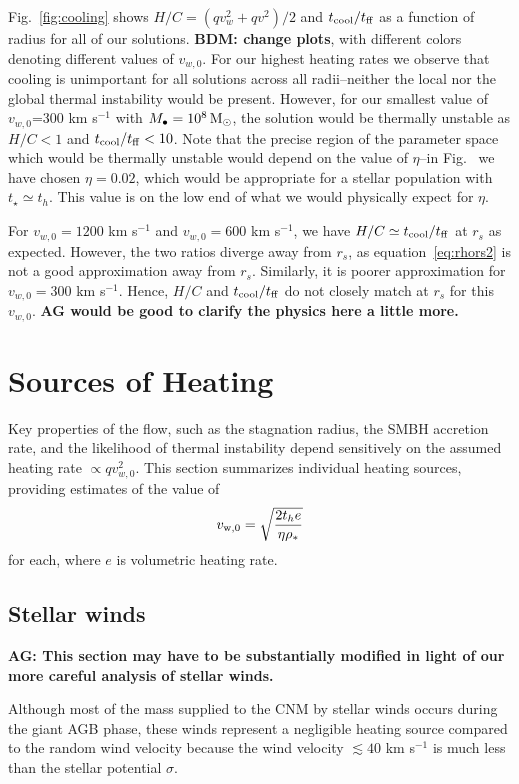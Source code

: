 \documentclass[usenatbib,fleqn]{mn2e}
\newcommand{\rs}{r_s}
\newcommand{\vw}{v_w}
\newcommand{\rhostar}{\rho_*}
\newcommand{\Mbh}[1][]{M_{\bullet#1}}
\newcommand{\vwO}{v_{w,0}}
\newcommand{\tage}{t_{\star}}
\renewcommand{\th}{t_h}
\newcommand{\tcool}{t_{\rm cool}}
\newcommand{\tff}{t_{\rm ff}}
\begin{document}
Fig.~\ref{fig:cooling} shows $H/C=(q \vw^2+q v^2)/2$ and $\tcool/\tff$
as a function of radius for all of our solutions. {\bf BDM: change
  plots}, with different colors denoting different values of $\vwO$.
For our highest heating rates we observe that cooling is unimportant
for all solutions across all radii--neither the local nor the global
thermal instability would be present. However,  for our smallest value
of $\vwO$=300 km s$^{-1}$ with $\Mbh=10^8 \Msun$, the solution would be
thermally unstable as $H/C<1$ and $\tcool/\tff<10$. Note that the
precise region of the parameter space which would be thermally
unstable would depend on the value of $\eta$--in
Fig.~\pageref{fig:cooling} we have chosen $\eta=0.02$, which would be
appropriate for a stellar population with $\tage\simeq \th$. This
value is on the low end of what we would physically expect for
$\eta$. 

For $\vwO=1200$ km s$^{-1}$ and $\vwO=600$ km s$^{-1}$, we have
$H/C\simeq\tcool/\tff$ at $\rs$ as expected. However, the two ratios
diverge away from $\rs$, as equation~\eqref{eq:rhors2} is not a good
approximation away from $\rs$. Similarly, it is poorer approximation
for $\vwO=300$ km s$^{-1}$. Hence, $H/C$ and $\tcool/\tff$ do not
closely match at $\rs$ for this $\vwO$. {\bf AG would be good to
  clarify the physics here a little more.}

\section{Sources of Heating}
\label{sec:heating}

Key properties of the flow, such as the stagnation radius, the SMBH accretion rate, and the likelihood of thermal instability depend sensitively on the assumed heating rate $\propto qv_{w,0}^{2}$.  This section summarizes individual heating sources, providing estimates of the value of
\begin{align}
  v_{\rm w,0} = \sqrt{\frac{2 t_h e}{\eta \rhostar}}
  \label{eq:vw_eff}
\end{align}
for each, where $e$ is volumetric heating rate.  

\subsection{Stellar winds} 
{\bf AG: This section may have to be substantially modified in light
  of our more careful analysis of stellar winds.}

Although most of the mass supplied to the CNM by stellar winds occurs
during the giant AGB phase, these winds represent a negligible heating
source compared to the random wind velocity because the wind velocity
$\lesssim 40$ km s$^{-1}$ is much less than the stellar potential
$\sigma$.
\end{document}
